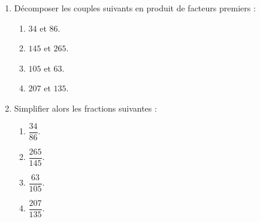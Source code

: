 \begin{exercice*}    
    \begin{enumerate}
        \item Décomposer les couples suivants en produit de facteurs premiers :
        \begin{multicols}{2}                
            \begin{enumerate}
                \item $34$ et $86$.
                \item $145$ et $265$.
                \item $105$ et $63$.
                \item $207$ et $135$.
            \end{enumerate}
        \end{multicols}
        \item Simplifier alors les fractions suivantes :
        \begin{multicols}{2}
            \begin{spacing}{2}
                \begin{enumerate}
                    \item $\dfrac{34}{86}$.
                    \item $\dfrac{265}{145}$.
                    \item $\dfrac{63}{105}$.
                    \item $\dfrac{207}{135}$.
                \end{enumerate}                    
            \end{spacing}
        \end{multicols}
    \end{enumerate}                   
    
\end{exercice*}
